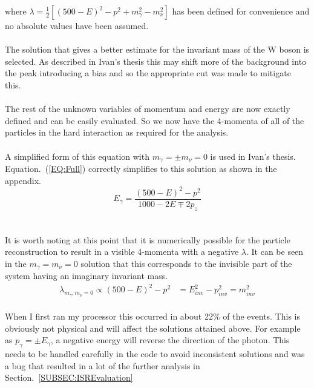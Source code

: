 where $ {\lambda} = \frac{1}{2}[{(500 - E)}^2 - {p}^{2} + {m}_{\gamma}^{2} - {m}_{\nu}^{2}] $ has been defined for convenience and no absolute values have been assumed.
\\\\
The solution that gives a better estimate for the invariant mass of the W boson is selected.  As described in Ivan's thesis \cite{IvanMarchesini} this may shift more of the background into the peak introducing a bias and so the appropriate cut was made to mitigate this.
\\\\
The rest of the unknown variables of momentum and energy are now exactly defined and can be easily evaluated. So we now have the 4-momenta of all of the particles in the hard interaction as required for the analysis.
\\\\
A simplified form of this equation with ${m}_{\gamma}= \pm {m}_{\nu} = 0$ is used in Ivan's thesis. Equation.~(\ref{EQ:Full}) correctly simplifies to this solution as shown in the appendix.
 \begin{equation}
     \label{EQ:Simple}
  {E}_{\gamma} = \frac{ {(500 - E)}^2 - {p}^{2}}{1000 -2 E  \mp 2{p}_{z}}
\end{equation}
\\\\
 It is worth noting at this point that it is numerically possible for the particle reconstruction to result in a visible 4-momenta with a negative $\lambda$. It can be seen in the ${m}_{\gamma} = {m}_{\nu} =0$ solution that this corresponds to the invisible part of the system having an imaginary invariant mass.
\\
 \begin{align}
     \label{EQ:invariantMassNegative}
     {\lambda}_{{m}_{\gamma}, {m}_{\nu} = 0} \propto {(500 - E)}^2 - {p}^{2} &= {E}_{inv}^2 - {p}_{inv}^{2} = {m}_{inv}^2
 \end{align}
\\
When I first ran my processor this occurred in about 22\% of the events. This is obviously not physical and will affect the solutions attained above. For example as ${p}_{\gamma}= \pm {E}_{\gamma}$, a negative energy will reverse the direction of the photon. This needs to be handled carefully in the code to avoid inconsistent solutions and was a bug that resulted in a lot of the further analysis in Section.~\ref{SUBSEC:ISREvaluation}
\\\\
